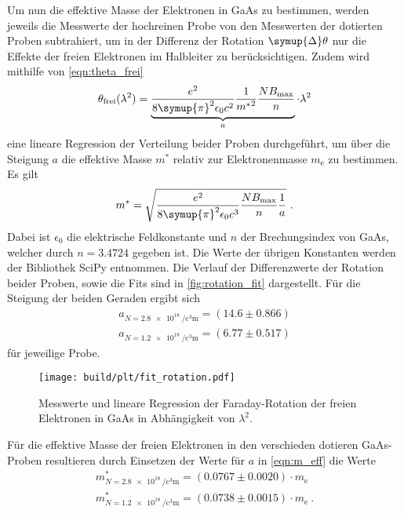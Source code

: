 Um nun die effektive Masse der Elektronen in GaAs zu bestimmen,
werden jeweils die Messwerte der hochreinen Probe von den Messwerten der dotierten Proben subtrahiert,
um in der Differenz der Rotation $\symup{\Delta}\theta$ nur die Effekte der freien Elektronen im Halbleiter zu berücksichtigen.
Zudem wird mithilfe von \autoref{eqn:theta_frei}
\begin{equation*}
    \theta_\text{frei} (\lambda^2) = \underbrace{\frac{e^2}{8 \symup{\pi}^2 \epsilon_0 c^2} \frac{1}{{m^{*}}^2} \frac{N B_\text{max}}{n}}_{a} \cdot \lambda^2
\end{equation*}
eine lineare Regression der Verteilung beider Proben durchgeführt,
um über die Steigung $a$ die effektive Masse $m^*$ relativ zur Elektronenmasse $m_\text{e}$ zu bestimmen.
Es gilt
\begin{equation}
    m^* = \sqrt{\frac{e^2}{8 \symup{\pi}^2 \epsilon_0 c^3} \frac{N B_\text{max}}{n} \frac{1}{a}} \ .
    \label{eqn:m_eff}
\end{equation}
Dabei ist $\epsilon_0$ die elektrische Feldkonstante und $n$ der Brechungsindex von GaAs,
welcher durch $n = 3.4724$ \cite{brechungsindex} gegeben ist.
Die Werte der übrigen Konstanten werden der Bibliothek SciPy \cite{SciPy} entnommen.
Die Verlauf der Differenzwerte der Rotation beider Proben,
sowie die Fits sind in \autoref{fig:rotation_fit} dargestellt.
Für die Steigung der beiden Geraden ergibt sich
\begin{gather*}
    a_{N=\SI[per-mode=reciprocal]{2.8e18}{\per\cubic\centi\meter}} = (14.6 \pm 0.866) \\
    a_{N=\SI[per-mode=reciprocal]{1.2e18}{\per\cubic\centi\meter}} = (6.77 \pm 0.517)
\end{gather*}
für jeweilige Probe.
\begin{figure}
    \centering
    \texttt{[image: build/plt/fit\_rotation.pdf]}
    \caption{Messwerte und lineare Regression der Faraday-Rotation der freien Elektronen in GaAs in Abhängigkeit von $\lambda^2$.}
    \label{fig:rotation_fit}
\end{figure}
Für die effektive Masse der freien Elektronen in den verschieden dotieren GaAs-Proben resultieren durch Einsetzen der Werte für $a$ in \autoref{eqn:m_eff} die Werte
\begin{gather*}
    m^*_{N=\SI[per-mode=reciprocal]{2.8e18}{\per\cubic\centi\meter}} = (0.0767 \pm 0.0020) \cdot m_\text{e} \\
    m^*_{N=\SI[per-mode=reciprocal]{1.2e18}{\per\cubic\centi\meter}} = (0.0738 \pm 0.0015) \cdot m_\text{e} \ .
\end{gather*}